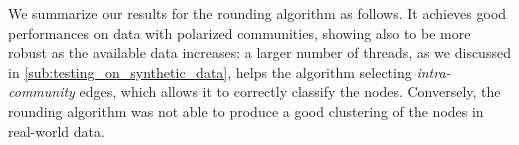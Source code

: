 \bigskip

We summarize our results for the rounding algorithm as follows. It achieves good performances on data with
polarized communities, showing also to be more robust as the
available data increases: a larger number of threads, as we discussed
in \autoref{sub:testing_on_synthetic_data}, helps the algorithm selecting
\emph{intra-community} edges, which allows it to correctly classify the nodes.
Conversely, the rounding algorithm was not able to produce a good clustering of the
nodes in real-world data.
